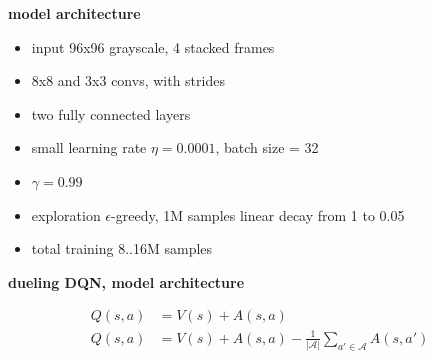 \documentclass[xcolor=dvipsnames]{beamer}
\begin{document}
\begin{frame}{\bf model architecture}


  \begin{itemize}
    \item input 96x96 grayscale, 4 stacked frames
    \item 8x8 and 3x3 convs, with strides
    \item two fully connected layers
    \item small learning rate $\eta = 0.0001$, batch size = 32
    \item $\gamma = 0.99$
    \item exploration $\epsilon$-greedy, 1M samples linear decay from 1 to 0.05
    \item total training 8..16M samples
  \end{itemize}
 
\end{frame}






\begin{frame}{\bf dueling DQN, model architecture}


  \begin{align*}
    Q(s, a) &= V(s) + A(s, a) \\
    Q(s, a) &= V(s) + A(s, a) - \frac{1}{|\mathcal{A}|}\sum_{a' \in \mathcal{A}}A(s, a')
  \end{align*}


\end{frame}
\end{document}
